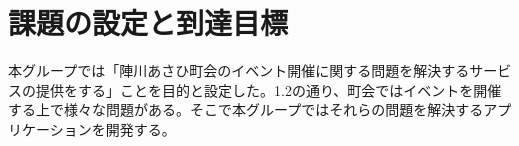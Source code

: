 \section{課題の設定と到達目標}
本グループでは「陣川あさひ町会のイベント開催に関する問題を解決するサービスの提供をする」ことを目的と設定した。1.2の通り、町会ではイベントを開催する上で様々な問題がある。そこで本グループではそれらの問題を解決するアプリケーションを開発する。
